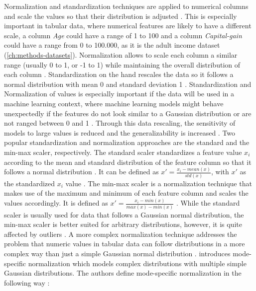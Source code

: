 Normalization and standardization techniques are applied to numerical columns and scale the values so that their distribution is adjusted \cite{garcia2016BigDataPreprocessing}.
This is especially important in tabular data, where numerical features are likely to have a different scale, \eg a column \textit{Age} could have a range of 1 to 100 and a column \textit{Capital-gain} could have a range from 0 to 100.000, as it is the adult income dataset \cite{Dua:2019} (\autoref{ch:methods-datasets}).
Normalization allows to scale each column a similar range (usually 0 to 1, or -1 to 1) while maintaining the overall distribution of each column \cite{izonin2022TwoStepDataNormalization}.
Standardization on the hand rescales the data so it follows a normal distribution with mean 0 and standard deviation 1 \cite{scikit-learndevelopers2023PreprocessingData}.
Standardization and Normalization of values is especially important if the data will be used in a machine learning context, where machine learning models might behave unexpectedly if 
the features do not look similar to a Gaussian distribution or are not ranged between 0 and 1 \cite{scikit-learn, scikit-learndevelopers2023PreprocessingData}.
Through this data rescaling, the sensitivity of models to large values is reduced and the generalizability is increased \cite{izonin2022TwoStepDataNormalization}.
Two popular standardization and normalization approaches are the standard and the min-max scaler, respectively.
The standard scaler standardizes a feature value $x_i$ according to the mean and standard distribution of the feature column so that it follows a normal distribution \cite{garcia2016BigDataPreprocessing, izonin2022TwoStepDataNormalization}.
It can be defined as $x' = \frac{x_i-mean(x)}{std(x)}$, with $x'$ as the standardized $x_i$ value \cite{izonin2022TwoStepDataNormalization}.
The min-max scaler is a normalization technique that makes use of the maximum and minimum of each feature column and scales the values accordingly.
It is defined as $x' = \frac{x_i - min(x)}{max(x) - min(x)}$ \cite{izonin2022TwoStepDataNormalization}.
While the standard scaler is usually used for data that follows a Gaussian normal distribution, the min-max scaler is better suited for arbitrary distributions, however, it is quite affected by outliers \cite{choudhury2020FeatureScalingEffect}.
A more complex normalization technique addresses the problem that numeric values in tabular data can follow distributions in a more complex way than just a simple Gaussian normal distribution \cite{zhao2022CTABGANEnhancingTabular, xu2019ModelingTabularData}.
\textcite{xu2019ModelingTabularData} introduces mode-specific normalization which models complex distributions with multiple simple Gaussian distributions.
The authors define mode-specific normalization in the following way \cite[p. 3-4]{xu2019ModelingTabularData}:

